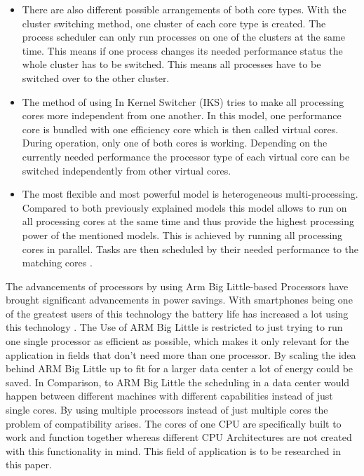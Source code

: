 \begin{itemize}
\item
There are also different possible arrangements of both core types. 
With the cluster switching method, one cluster of each core type is created.
The process scheduler can only run processes on one of the clusters at the same time. 
This means if one process changes its needed performance status the whole cluster has to be switched. 
This means all processes have to be switched over to the other cluster.

\item 
The method of using In Kernel Switcher (IKS) tries to make all processing cores more independent from one another.
In this model, one performance core is bundled with one efficiency core which is then called virtual cores.
During operation, only one of both cores is working. 
Depending on the currently needed performance the processor type of each virtual core can be switched independently from other virtual cores.

\item  
The most flexible and most powerful model is heterogeneous multi-processing.
Compared to both previously explained models this model allows to run on all processing cores at the same time 
and thus provide the highest processing power of the mentioned models. 
This is achieved by running all processing cores in parallel.
Tasks are then scheduled by their needed performance to the matching cores
\cite{bigLITTL43:online}.

\end{itemize}
The advancements of processors by using Arm Big Little-based Processors have brought significant advancements in power savings. 
With smartphones being one of the greatest users of this technology the battery life has increased a lot using this technology
\cite{bigLITTL50:online}. 
The Use of ARM Big Little is restricted to just trying to run one single processor as efficient as possible, 
which makes it only relevant for the application in fields that don't need more than one processor.
By scaling the idea behind ARM Big Little up to fit for a larger data center a lot of energy could be saved. 
In Comparison, to ARM Big Little the scheduling in a data center would happen between different machines with different capabilities instead of just single cores. 
By using multiple processors instead of just multiple cores the problem of compatibility arises. 
The cores of one CPU are specifically built to work and function together 
whereas different CPU Architectures are not created with this functionality in mind.
This field of application is to be researched in this paper.